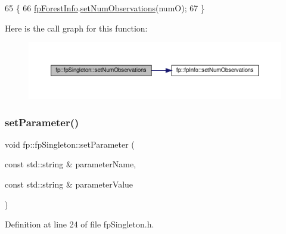 \begin{DoxyCode}
65                                                     \{
66                 \hyperlink{classfp_1_1fpSingleton_a85965009befa72a749ae498fa5b6ccfa}{fpForestInfo}.\hyperlink{classfp_1_1fpInfo_ad17492e79df7bca55d98438fec2f004b}{setNumObservations}(numO);
67             \}
\end{DoxyCode}
Here is the call graph for this function\+:\nopagebreak
\begin{figure}[H]
\begin{center}
\leavevmode
\includegraphics[width=350pt]{classfp_1_1fpSingleton_acf821a8fda9d3296cde7dc33b9c1ddb5_cgraph}
\end{center}
\end{figure}
\mbox{\label{classfp_1_1fpSingleton_a90f275b256694ea7b16577d547a33044}} 
\subsubsection{\texorpdfstring{set\+Parameter()}{setParameter()}\hspace{0.1cm}{\footnotesize\ttfamily [1/3]}}
{\footnotesize\ttfamily void fp\+::fp\+Singleton\+::set\+Parameter (\begin{DoxyParamCaption}\item[{const std\+::string \&}]{parameter\+Name,  }\item[{const std\+::string \&}]{parameter\+Value }\end{DoxyParamCaption})\hspace{0.3cm}{\ttfamily [inline]}}



Definition at line 24 of file fp\+Singleton.\+h.


